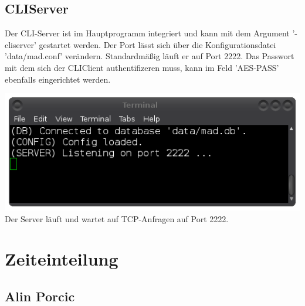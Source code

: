 \documentclass[12pt,a4paper]{report}
\begin{document}
\begin{onehalfspace}
\chapter{CLIServer}

Der CLI-Server ist im Hauptprogramm integriert und kann mit dem Argument '-cliserver' gestartet werden. Der Port lässt sich über die Konfigurationsdatei 'data/mad.conf' verändern. Standardmäßig läuft er auf Port 2222. Das Passwort mit dem sich der CLIClient authentifizeren muss, kann im Feld 'AES-PASS' ebenfalls eingerichtet werden.

\begin{center}
\includegraphics[scale=0.6]{img/cli_server.png}\\
Der Server läuft und wartet auf TCP-Anfragen auf Port 2222.
\end{center}

\part{Zeiteinteilung}

\chapter{Alin Porcic}

\begin{center}
\begin{tabular}{c|c|c}


\end{tabular}
\end{center}
\end{onehalfspace}
\end{document}
